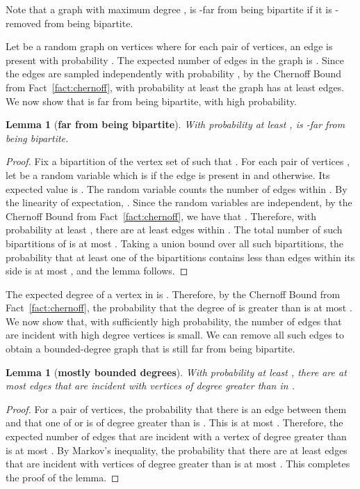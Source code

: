 \documentclass[11pt]{article}
\newtheorem{lemma}[theorem]{Lemma}
\begin{document}
Note that a graph  with maximum degree , is -far from being bipartite if it is
-removed from being bipartite.

Let  be a random graph on  vertices where for each pair of vertices, an edge is present with
probability . The expected number of edges in the graph is . Since the edges are
sampled independently with probability , by the Chernoff Bound from
Fact~\ref{fact:chernoff}, with probability at least  the graph has at least 
edges.  We now show that  is far from being bipartite, with high probability.
\begin{lemma}[\textbf{far from being bipartite}]
  With probability at least ,  is -far from being bipartite.
  \label{lem:farness}
\end{lemma}
\begin{proof}
  Fix a bipartition  of the vertex set of  such that .  For each pair of
  vertices , let  be a random variable which is  if the edge  is
  present in  and  otherwise. Its expected value is . The random variable
   counts the number of edges within . By the linearity of expectation, . Since the random variables  are
  independent, by the Chernoff Bound from Fact~\ref{fact:chernoff}, we have that . Therefore,
  with probability at least , there are at least  edges within . The total
  number of such bipartitions of  is at most .
  Taking a union bound over all such bipartitions, the probability that at least one of the
  bipartitions contains less than  edges within its  side is at most , and the lemma
  follows.
\end{proof}

The expected degree of a vertex  in  is . Therefore, by the Chernoff Bound from Fact~\ref{fact:chernoff}, the
probability that the degree of  is greater than  is at most .  We now
show that, with sufficiently high probability, the number of edges that are incident with high
degree vertices is small. We can remove all such edges to obtain a bounded-degree graph that is
still far from being bipartite.

\begin{lemma}[\textbf{mostly bounded degrees}]
  With probability at least , there are at most  edges that are incident with
  vertices of degree greater than  in .
  \label{lem:edges-high-degre}
\end{lemma}
\begin{proof}
  For a pair  of vertices, the probability that there is an edge between them and that one of
   or  is of degree greater than  is . This is at most .
  Therefore, the expected number of edges that are incident with a vertex of degree greater
  than  is at most .  By Markov's inequality, the probability
  that there are at least  edges that are incident with vertices of degree greater than  is at
  most . This completes the proof of the lemma.
\end{proof}
\end{document}
